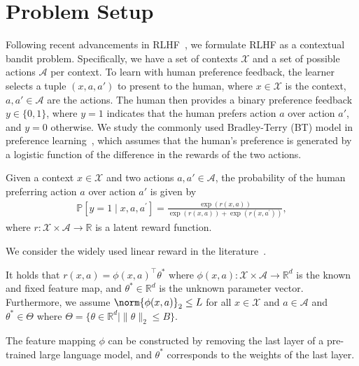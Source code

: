 \section{Problem Setup}
\label{sec:problem_setup}

Following recent advancements in RLHF~\citep{ICML'23:Zhu-Principled,arXiv'24:Das-RLHF-active,ICML'24:Xiong-Iterative}, we formulate RLHF as a contextual bandit problem. Specifically, we have a set of contexts $\mathcal{X}$ and a set of possible actions $\mathcal{A}$ per context. To learn with human preference feedback, the learner selects a tuple $(x, a, a')$ to present to the human, where $x \in \mathcal{X}$ is the context, $a, a' \in \mathcal{A}$ are the actions. The human then provides a binary preference feedback $y \in \{0, 1\}$, where $y = 1$ indicates that the human prefers action $a$ over action $a'$, and $y = 0$ otherwise. We study the commonly used Bradley-Terry (BT) model in preference learning~\citep{BT-model}, which assumes that the human's preference is generated by a logistic function of the difference in the rewards of the two actions.

\begin{myDef}
    \label{def:BT}
    Given a context $x \in \mathcal{X}$ and two actions $a, a' \in \mathcal{A}$, the probability of the human preferring action $a$ over action $a'$ is given by
    \begin{align}
        \mathbb{P}\left[y=1 \mid x, a, a^{\prime}\right] = \frac{\exp \left(r(x, a)\right)}{\exp \left(r(x, a)\right)+\exp \left(r\left(x, a^{\prime}\right)\right)},
        \label{eq:BT}
    \end{align}
    where $r: \mathcal{X} \times \mathcal{A} \to \mathbb{R}$ is a latent reward function.
\end{myDef}

We consider the widely used linear reward in the literature~\citep{ICML'23:Zhu-Principled,ICLR'25:VPO}.
\begin{myAssumption}
    \label{asm:linear-reward}
    It holds that $r(x, a) = \phi(x, a)^\top \theta^*$ where $\phi(x, a): \mathcal{X} \times \mathcal{A} \to \mathbb{R}^d$ is the known and fixed feature map, and $\theta^* \in \mathbb{R}^d$ is the unknown parameter vector. Furthermore, we assume $\norm{\phi(x, a)}_2 \leq L$ for all $x \in \mathcal{X}$ and $a \in \mathcal{A}$ and $\theta^* \in \Theta$ where $\Theta = \{\theta \in \mathbb{R}^d \mid \|\theta\|_2 \leq B\}$.
\end{myAssumption}
\begin{myRemark}
    The feature mapping $\phi$ can be constructed by removing the last layer of a pre-trained large language model, and $\theta^*$ corresponds to the weights of the last layer.
\end{myRemark}

